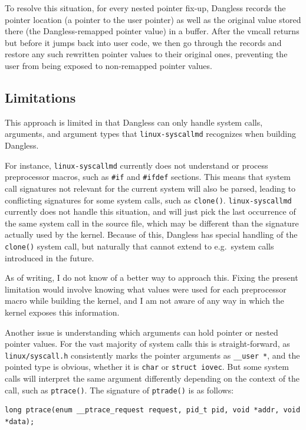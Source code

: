 To resolve this situation, for every nested pointer fix-up, Dangless records the pointer location (a pointer to the user pointer) as well as the original value stored there (the Dangless-remapped pointer value) in a buffer. After the vmcall returns but before it jumps back into user code, we then go through the records and restore any such rewritten pointer values to their original ones, preventing the user from being exposed to non-remapped pointer values.

\subsection{Limitations}

This approach is limited in that Dangless can only handle system calls, arguments, and argument types that \texttt{linux-syscallmd} recognizes when building Dangless.

For instance, \texttt{linux-syscallmd} currently does not understand or process preprocessor macros, such as \lstinline!#if! and \lstinline!#ifdef! sections. This means that system call signatures not relevant for the current system will also be parsed, leading to conflicting signatures for some system calls, such as \lstinline!clone()!. \texttt{linux-syscallmd} currently does not handle this situation, and will just pick the last occurrence of the same system call in the source file, which may be different than the signature actually used by the kernel. Because of this, Dangless has special handling of the \lstinline!clone()! system call, but naturally that cannot extend to e.g.\ system calls introduced in the future.

As of writing, I do not know of a better way to approach this. Fixing the present limitation would involve knowing what values were used for each preprocessor macro while building the kernel, and I am not aware of any way in which the kernel exposes this information.

Another issue is understanding which arguments can hold pointer or nested pointer values. For the vast majority of system calls this is straight-forward, as \texttt{linux/syscall.h} consistently marks the pointer arguments as \lstinline!__user *!, and the pointed type is obvious, whether it is \lstinline!char! or \lstinline!struct iovec!. But some system calls will interpret the same argument differently depending on the context of the call, such as \lstinline!ptrace()!. The signature of \lstinline!ptrade()! is as follows:

\begin{lstlisting}
long ptrace(enum __ptrace_request request, pid_t pid, void *addr, void *data);
\end{lstlisting}

